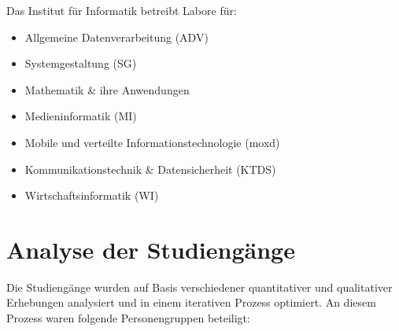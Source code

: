 Das Institut für Informatik betreibt Labore für:

\begin{itemize}
\tightlist
\item
  Allgemeine Datenverarbeitung (ADV)
\item
  Systemgestaltung (SG)
\item
  Mathematik \& ihre Anwendungen
\item
  Medieninformatik (MI)
\item
  Mobile und verteilte Informationstechnologie (moxd)
\item
  Kommunikationstechnik \& Datensicherheit (KTDS)
\item
  Wirtschaftsinformatik (WI)
\end{itemize}

\chapter{Analyse der Studiengänge}\label{analyse-der-studienguxe4nge}

Die Studiengänge wurden auf Basis verschiedener quantitativer und
qualitativer Erhebungen analysiert und in einem iterativen Prozess
optimiert. An diesem Prozess waren folgende Personengruppen beteiligt:

